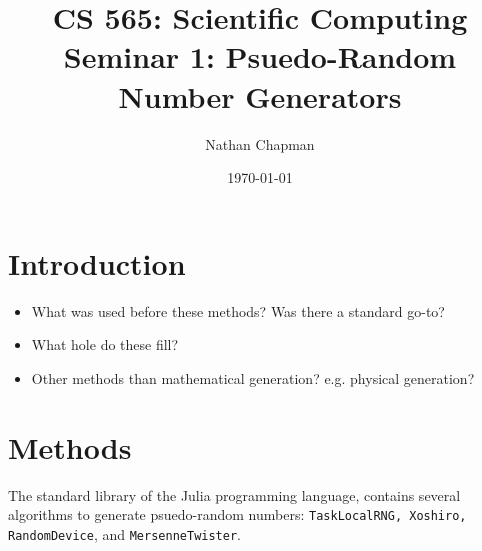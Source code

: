\documentclass{article}
\title{\vspace*{-0.625in}CS 565: Scientific Computing \\ Seminar 1: Psuedo-Random Number Generators}
\author{Nathan Chapman}
\date{\today}
\begin{document}
    \maketitle

    \section*{Introduction}

        \begin{itemize}
            \item What was used before these methods?  Was there a standard go-to?
            \item What hole do these fill?
            \item Other methods than mathematical generation?  e.g. physical generation?
        \end{itemize}
    
    \section*{Methods}

        The standard library of the Julia programming language, contains several algorithms to generate psuedo-random numbers\cite*{Julia-2017}: \texttt{TaskLocalRNG, Xoshiro, RandomDevice}, and \texttt{MersenneTwister}.

\end{document}
